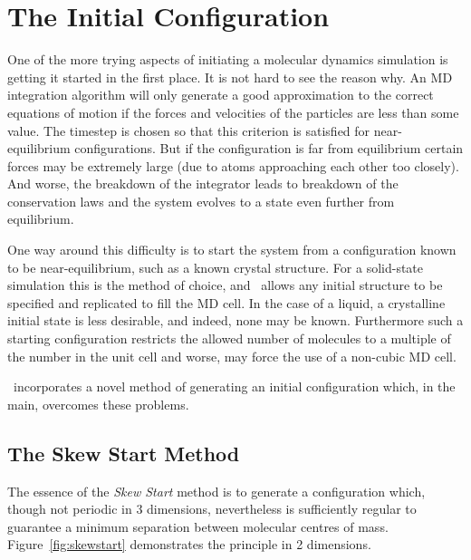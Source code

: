 \section{The Initial Configuration}%
One of the more trying aspects of initiating a molecular dynamics
simulation is getting it started in the first place.  It is not hard
to see the reason why.  An MD integration algorithm will only generate
a good approximation to the correct equations of motion if the forces
and velocities of the particles are less than some value.  The
timestep is chosen so that this criterion is satisfied for
near-equilibrium configurations.  But if the configuration is far from
equilibrium certain forces may be extremely large (due to atoms
approaching each other too closely).  And worse, the breakdown of the
integrator leads to breakdown of the conservation laws and the
system evolves to a state even further from equilibrium.

One way around this difficulty is to start the system from a
configuration known to be near-equilibrium, such as a known crystal
structure.   For a solid-state simulation this is the method of
choice, and \moldy\ allows any initial structure to be specified and
replicated to fill the MD cell.  In the case of a liquid, a
crystalline initial state is less desirable, and indeed, none may be
known.  Furthermore such a starting configuration restricts the
allowed number of molecules to a multiple of the number in the unit
cell and worse, may force the use of a non-cubic MD cell.

\moldy\ incorporates a novel method of generating an initial
configuration which, in the main, overcomes these problems.
\subsection{The Skew Start Method}
\label{sec:skewstart}
The essence of the {\em Skew Start\/} method is to generate a
configuration which, though not periodic in 3 dimensions, nevertheless
is sufficiently regular to guarantee a minimum separation between
molecular centres of mass.  Figure~\ref{fig:skewstart} demonstrates
the principle in 2 dimensions.

